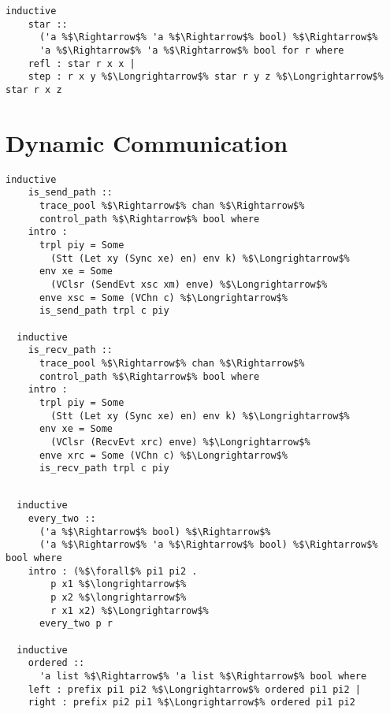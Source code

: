 \begin{lstlisting}[style=codestyle1, escapechar=\%]
  inductive
    star ::
      ('a %$\Rightarrow$% 'a %$\Rightarrow$% bool) %$\Rightarrow$%
      'a %$\Rightarrow$% 'a %$\Rightarrow$% bool for r where
    refl : star r x x |
    step : r x y %$\Longrightarrow$% star r y z %$\Longrightarrow$% star r x z
  \end{lstlisting}



\section{Dynamic Communication}

\begin{lstlisting}[style=codestyle1, escapechar=\%]
  inductive
    is_send_path ::
      trace_pool %$\Rightarrow$% chan %$\Rightarrow$%
      control_path %$\Rightarrow$% bool where
    intro :
      trpl piy = Some
        (Stt (Let xy (Sync xe) en) env k) %$\Longrightarrow$%
      env xe = Some
        (VClsr (SendEvt xsc xm) enve) %$\Longrightarrow$%
      enve xsc = Some (VChn c) %$\Longrightarrow$%
      is_send_path trpl c piy

  inductive
    is_recv_path ::
      trace_pool %$\Rightarrow$% chan %$\Rightarrow$%
      control_path %$\Rightarrow$% bool where
    intro :
      trpl piy = Some
        (Stt (Let xy (Sync xe) en) env k) %$\Longrightarrow$%
      env xe = Some
        (VClsr (RecvEvt xrc) enve) %$\Longrightarrow$%
      enve xrc = Some (VChn c) %$\Longrightarrow$%
      is_recv_path trpl c piy

  \end{lstlisting}
\begin{lstlisting}[style=codestyle1, escapechar=\%]

  inductive
    every_two ::
      ('a %$\Rightarrow$% bool) %$\Rightarrow$%
      ('a %$\Rightarrow$% 'a %$\Rightarrow$% bool) %$\Rightarrow$% bool where
    intro : (%$\forall$% pi1 pi2 .
        p x1 %$\longrightarrow$%
        p x2 %$\longrightarrow$%
        r x1 x2) %$\Longrightarrow$%
      every_two p r

  inductive
    ordered ::
      'a list %$\Rightarrow$% 'a list %$\Rightarrow$% bool where
    left : prefix pi1 pi2 %$\Longrightarrow$% ordered pi1 pi2 |
    right : prefix pi2 pi1 %$\Longrightarrow$% ordered pi1 pi2

  \end{lstlisting}
